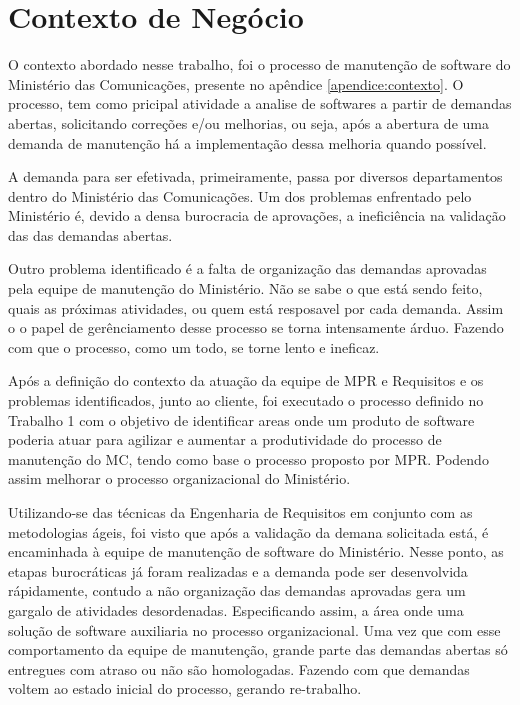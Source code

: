 \chapter[Contexto de Negócio]{Contexto de Negócio}

O contexto abordado nesse trabalho, foi o processo de manutenção de software do Ministério das Comunicações, presente
no apêndice \ref{apendice:contexto}. O processo, tem como pricipal atividade a analise de softwares a partir de
demandas abertas, solicitando correções e/ou melhorias, ou seja, após a abertura de uma demanda de manutenção há
a implementação dessa melhoria quando possível.

A demanda para ser efetivada, primeiramente, passa por diversos departamentos dentro do Ministério das Comunicações.
Um dos problemas enfrentado pelo Ministério é, devido a densa burocracia de aprovações, a ineficiência na validação das
das demandas abertas.

Outro problema identificado é a falta de organização das demandas aprovadas pela equipe de manutenção do Ministério.
Não se sabe o que está sendo feito, quais as próximas atividades, ou quem está resposavel por cada demanda. Assim o
o papel de gerênciamento desse processo se torna intensamente árduo. Fazendo com que o processo, como um todo, se torne
lento e ineficaz.

Após a definição do contexto da atuação da equipe de MPR e Requisitos e os problemas identificados, junto ao cliente,
foi executado o processo definido no Trabalho 1 com o objetivo de identificar areas onde um produto de software poderia
atuar para agilizar e aumentar a produtividade do processo de manutenção do MC, tendo como base o processo proposto por MPR.
Podendo assim melhorar o processo organizacional do Ministério.

Utilizando-se das técnicas da Engenharia de Requisitos em conjunto com as metodologias ágeis, foi visto que após a
validação da demana solicitada está, é encaminhada à equipe de manutenção de software do Ministério. Nesse ponto,
as etapas burocráticas já foram realizadas e a demanda pode ser desenvolvida rápidamente, contudo a não organização das
demandas aprovadas gera um gargalo de atividades desordenadas. Especificando assim, a área onde uma solução de software
auxiliaria no processo organizacional. Uma vez que com esse comportamento da equipe de manutenção, grande parte das demandas abertas só entregues com atraso ou não são
homologadas. Fazendo com que demandas voltem ao estado inicial do processo, gerando re-trabalho.

